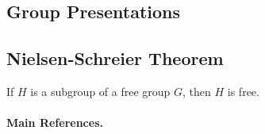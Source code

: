\subsection{Group Presentations}
\subsection{Nielsen-Schreier Theorem}
\begin{theorem}
	If $H$ is a subgroup of a free group $G$, then $H$ is free.
\end{theorem}



\paragraph{Main References.} \cite{Lang2002,Bergman2015,Ribes2010}